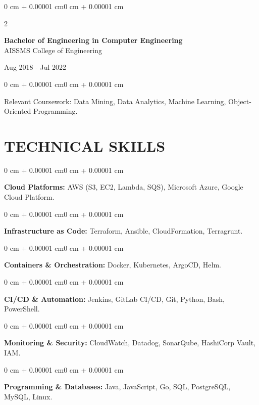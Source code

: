 \documentclass[10pt, letterpaper]{article}
\newenvironment{onecolentry}{
    \begin{adjustwidth}{0 cm + 0.00001 cm}{0 cm + 0.00001 cm}
}{
    \end{adjustwidth}
}
\newenvironment{twocolentry}[2][]{
    \onecolentry
    \def\secondColumn{#2}
    \setcolumnwidth{\fill, 4.5 cm}
    \begin{paracol}{2}
}{
    \switchcolumn \raggedleft \secondColumn
    \end{paracol}
    \endonecolentry
}
\begin{document}
\begin{twocolentry}{
    Aug 2018 - Jul 2022
}
    \textbf{Bachelor of Engineering in Computer Engineering} \\
    AISSMS College of Engineering
\end{twocolentry}
\begin{onecolentry}
Relevant Coursework: Data Mining, Data Analytics, Machine Learning, Object-Oriented Programming.
\end{onecolentry}
\section{TECHNICAL SKILLS}
\begin{onecolentry}
\textbf{Cloud Platforms:} AWS (S3, EC2, Lambda, SQS), Microsoft Azure, Google Cloud Platform.
\end{onecolentry}
\vspace{0.06 cm}
\begin{onecolentry}
\textbf{Infrastructure as Code:} Terraform, Ansible, CloudFormation, Terragrunt.
\end{onecolentry}
\vspace{0.06 cm}
\begin{onecolentry}
\textbf{Containers \& Orchestration:} Docker, Kubernetes, ArgoCD, Helm.
\end{onecolentry}
\vspace{0.06 cm}
\begin{onecolentry}
\textbf{CI/CD \& Automation:} Jenkins, GitLab CI/CD, Git, Python, Bash, PowerShell.
\end{onecolentry}
\vspace{0.06 cm}
\begin{onecolentry}
\textbf{Monitoring \& Security:} CloudWatch, Datadog, SonarQube, HashiCorp Vault, IAM.
\end{onecolentry}
\vspace{0.06 cm}
\begin{onecolentry}
\textbf{Programming \& Databases:} Java, JavaScript, Go, SQL, PostgreSQL, MySQL, Linux.
\end{onecolentry}

\end{document}
